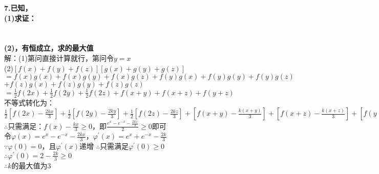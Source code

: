 \documentclass{article}
\begin{document}
    \newpage
    \noindent \textbf{7.已知， \\
    (1)求证： \\
    \quad {}  \\
    \quad {}   \\
    (2)\bm{$\forall x,y,z\in [0,+\infty)$}，有恒成立，求的最大值} \\
    解：(1)第问直接计算就行，第问令$y=x$ \\
    (2)$\left[f(x)+f(y)+f(z)\right]\left[g(x)+g(y)+g(z)\right]$ \\
    $=f(x)g(x)+f(x)g(y)+f(x)g(z)+f(y)g(x)+f(y)g(y)+f(y)g(z)$ \\
    \hspace*{0.35cm} $+f(z)g(x)+f(z)g(y)+f(z)g(z)$ \\
    $=\frac{1}{2}f(2x)+\frac{1}{2}f(2y)+\frac{1}{2}f(2z)+f(x+y)+f(x+z)+f(y+z)$ \\
    不等式转化为： \\
    $\frac{1}{2}\left[f(2x)-\frac{2kx}{3}\right]+\frac{1}{2}\left[f(2y)-\frac{2ky}{3}\right]+\frac{1}{2}\left[f(2z)-\frac{2kz}{3}\right]+\left[f(x+y)-\frac{k(x+y)}{3}\right]+\left[f(x+z)-\frac{k(x+z)}{3}\right]+\left[f(y+z)-\frac{k(y+z)}{3}\right]\geqslant 0$ \\
    $\therefore $\quad 只需满足：$f(x)-\frac{kx}{3}\geqslant 0$，即$\frac{e^{x}-e^{-x}-\frac{2kx}{3}}{2}\geqslant 0$即可 \\
    令$\varphi (x)=e^{x}-e^{-x}-\frac{2kx}{3}$，$\varphi^{'}(x)=e^{x}+e^{-x}-\frac{2k}{3}$ \\
    $\because $\quad $\varphi (0)=0$，且$\varphi^{'}(x)$递增 \quad $\therefore $\quad 只需满足$\varphi^{'}(0)\geqslant 0$ \\
    $\therefore $\quad $\varphi^{'}(0)=2-\frac{2k}{3}\geqslant 0$ \\
    $\therefore $\quad $k$的最大值为3
\end{document}
